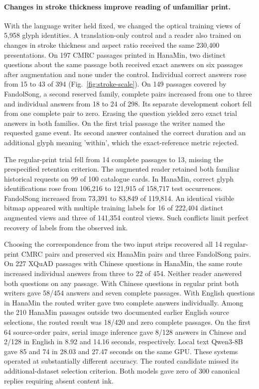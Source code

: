 \paragraph{Changes in stroke thickness improve reading of unfamiliar print.}
With the language writer held fixed, we changed the optical training views of 5,958 glyph identities. A translation-only control and a reader also trained on changes in stroke thickness and aspect ratio received the same 230,400 presentations. On 197 CMRC passages printed in HanaMin, two distinct questions about the same passage both received exact answers on six passages after augmentation and none under the control. Individual correct answers rose from 15 to 43 of 394 (Fig.~\ref{fig:stroke-scale}). On 149 passages covered by FandolSong, a second reserved family, complete pairs increased from one to three and individual answers from 18 to 24 of 298. Its separate development cohort fell from one complete pair to zero. Erasing the question yielded zero exact trial answers in both families. On the first trial passage the writer named the requested game event. Its second answer contained the correct duration and an additional glyph meaning 'within', which the exact-reference metric rejected.

The regular-print trial fell from 14 complete passages to 13, missing the prespecified retention criterion. The augmented reader retained both familiar historical requests on 99 of 100 catalogue cards. In HanaMin, correct glyph identifications rose from 106,216 to 121,915 of 158,717 test occurrences. FandolSong increased from 73,391 to 83,849 of 119,814. An identical visible bitmap appeared with multiple training labels for 16 of 222,404 distinct augmented views and three of 141,354 control views. Such conflicts limit perfect recovery of labels from the observed ink.

Choosing the correspondence from the two input strips recovered all 14 regular-print CMRC pairs and preserved six HanaMin pairs and three FandolSong pairs. On 227 XQuAD passages with Chinese questions in HanaMin, the same route increased individual answers from three to 22 of 454. Neither reader answered both questions on any passage. With Chinese questions in regular print both writers gave 58/454 answers and seven complete passages. With English questions in HanaMin the routed writer gave two complete answers individually. Among the 210 HanaMin passages outside two documented earlier English source selections, the routed result was 18/420 and zero complete passages. On the first 64 source-order pairs, serial image inference gave 8/128 answers in Chinese and 2/128 in English in 8.92 and 14.16 seconds, respectively. Local text Qwen3-8B gave 85 and 74 in 28.03 and 27.47 seconds on the same GPU. These systems operated at substantially different accuracy. The routed candidate missed its additional-dataset selection criterion. Both models gave zero of 300 canonical replies requiring absent content ink.
